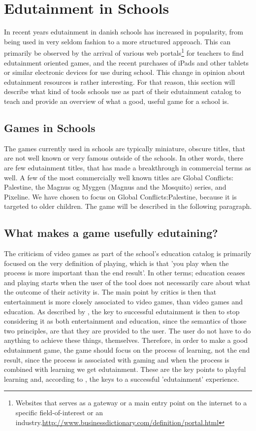 \section{Edutainment in Schools}
\label{sec:eduinsch}
In recent years edutainment in danish schools has increased in popularity, from being used in very seldom fashion to a more structured approach. 
This can primarily be observed by the arrival of various web portals\footnote{Websites that serves as a gateway or a main entry point on the internet to a specific field-of-interest or an industry.\url{http://www.businessdictionary.com/definition/portal.html}} for teachers to find edutainment oriented games, and the recent purchases of iPads and other tablets or similar electronic devices for use during school.
This change in opinion about edutainment resources is rather interesting. For that reason, this section will describe what kind of tools schools use as part of their edutainment catalog to teach and provide an overview of what a good, useful game for a school is.


\subsection{Games in Schools}

The games currently used in schools are typically miniature, obscure titles, that are not well known or very famous outside of the schools.
 In other words, there are few edutainment titles, that has made a breakthrough in commercial terms as well.
 A few of the most commercially well known titles are Global Conflicts: Palestine, the Magnus og Myggen (Magnus and the Mosquito) series, and Pixeline.
 We have chosen to focus on Global Conflicts:Palestine, because it is targeted to older children. The game will be described in the following paragraph.

\subsection{What makes a game usefully edutaining?}

The criticism of video games as part of the school's education catalog is primarily focused on the very definition of playing, which is that 'you play when the process is more important than the end result'.
In other terms; education ceases and playing starts when the user of the tool does not necessarily care about what the outcome of their activity is.
The main point by critics is then that entertainment is more closely associated to video games, than video games and education.
As described by \citep{edunoty}, the key to successful edutainment is then to stop considering it as both entertainment and education, since the semantics of those two principles, are that they are provided to the user. The user do not have to do anything to achieve these things, themselves.
Therefore, in order to make a good edutainment game, the game should focus on the process of learning, not the end result, since the process is associated with gaming and when the process is combined with learning we get edutainment.
These are the key points to playful learning and, according to \cite{edunoty}, the keys to a successful 'edutainment' experience.

